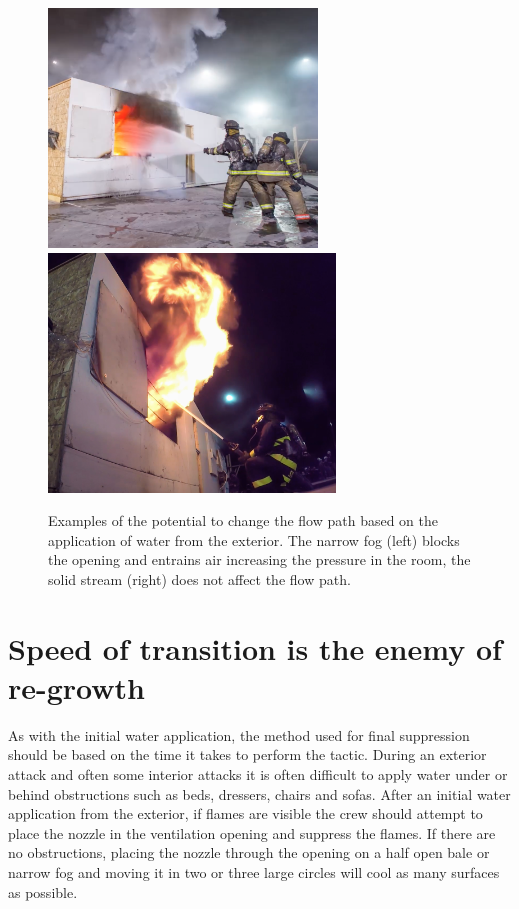\documentclass[12pt,oneside]{book}
\begin{document}
\begin{figure}[H]
\centering
\includegraphics[height=2.5in]{../0_Images/Tactical_Considerations/Flow_Path_Effect/Exterior_Fog}
\includegraphics[height=2.5in]{../0_Images/Tactical_Considerations/Flow_Path_Effect/Exterior_SS.jpg}
\caption[Exterior Application Can Change Flow path]{Examples of the potential to change the flow path based on the application of water from the exterior. The narrow fog (left) blocks the opening and entrains air increasing the pressure in the room, the solid stream (right) does not affect the flow path.}
\label{fig:flow_path_effect_TC_exerior_application}
\end{figure}

\section{Speed of transition is the enemy of re-growth} \label{tc:speed_enemy_regrowth}
As with the initial water application, the method used for final suppression should be based on the time it takes to perform the tactic. During an exterior attack and often some interior attacks it is often difficult to apply water under or behind obstructions such as beds, dressers, chairs and sofas. After an initial water application from the exterior, if flames are visible the crew should attempt to place the nozzle in the ventilation opening and suppress the flames. If there are no obstructions, placing the nozzle through the opening on a half open bale or narrow fog and moving it in two or three large circles will cool as many surfaces as possible. 
\end{document}
